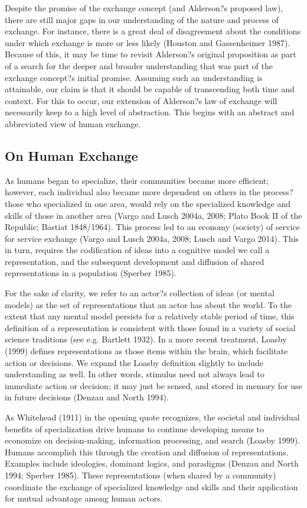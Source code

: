 Despite the promise of the exchange concept (and Alderson?s proposed law), there are still major gaps in our understanding of the nature and process of exchange. For instance, there is a great deal of disagreement about the conditions under which exchange is more or less likely (Houston and Gassenheimer 1987). Because of this, it may be time to revisit Alderson?s original proposition as part of a search for the deeper and broader understanding that was part of the exchange concept?s initial promise. Assuming such an understanding is attainable, our claim is that it should be capable of transcending both time and context. For this to occur, our extension of Alderson?s law of exchange will necessarily keep to a high level of abstraction. This begins with an abstract and abbreviated view of human exchange. 


\subsection{On Human Exchange}
As humans began to specialize, their communities became more efficient; however, each individual also became more dependent on others in the process?those who specialized in one area, would rely on the specialized knowledge and skills of those in another area (Vargo and Lusch 2004a, 2008; Plato Book II of the Republic; Bastiat 1848/1964). This process led to an economy (society) of service for service exchange (Vargo and Lusch 2004a, 2008; Lusch and Vargo 2014). This in turn, requires the codification of ideas into a cognitive model we call a representation, and the subsequent development and diffusion of shared representations in a population (Sperber 1985). 

For the sake of clarity, we refer to an actor?s collection of ideas (or mental models) as the set of representations that an actor has about the world. To the extent that any mental model persists for a relatively stable period of time, this definition of a representation is consistent with those found in a variety of social science traditions (see e.g. Bartlett 1932). In a more recent treatment, Loasby (1999) defines representations as those items within the brain, which facilitate action or decisions. We expand the Loasby definition slightly to include understanding as well. In other words, stimulus need not always lead to immediate action or decision; it may just be sensed, and stored in memory for use in future decisions (Denzau and North 1994). 

As Whitehead (1911) in the opening quote recognizes, the societal and individual benefits of specialization drive humans to continue developing means to economize on decision-making, information processing, and search (Loasby 1999). Humans accomplish this through the creation and diffusion of representations. Examples include ideologies, dominant logics, and paradigms (Denzau and North 1994; Sperber 1985). These representations (when shared by a community) coordinate the exchange of specialized knowledge and skills and their application for mutual advantage among human actors. 

